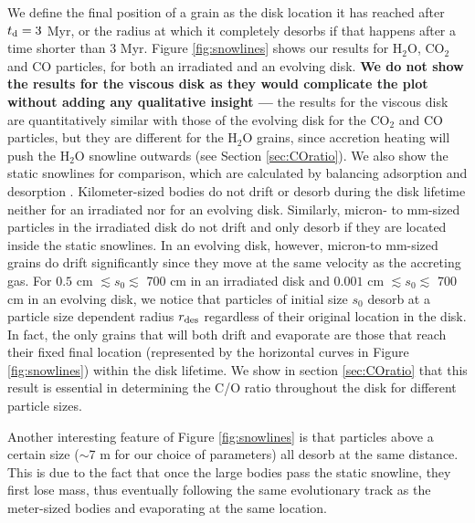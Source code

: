 \documentclass[apj]{emulateapj}
\begin{document}
We define the final position of a grain as the disk location it has reached after $t_{\rm d}=3$ Myr, or the radius at which it completely desorbs if that happens after a time shorter than 3 Myr.  Figure \ref{fig:snowlines} shows our results for H$_2$O, CO$_2$ and CO particles, for both an irradiated and an evolving disk. \textbf{We do not show the results for the viscous disk as they would complicate the plot without adding any qualitative insight --- } the results for the viscous disk are quantitatively similar with those of the evolving disk for the CO$_2$ and CO particles, but they are different for the H$_2$O grains, since accretion heating will push the H$_2$O snowline outwards (see Section \ref{sec:COratio}). We also show the static snowlines for comparison, which are calculated by balancing adsorption and desorption \citep{hollenbach09}. %
Kilometer-sized bodies do not drift or desorb during the disk lifetime neither for an irradiated nor for an evolving disk. Similarly, micron- to mm-sized particles in the irradiated disk do not drift and only %
desorb if %
they are located inside the static snowlines. %
In an evolving disk, however, micron-to mm-sized grains do drift significantly since they move at the same velocity as the accreting gas. For $0.5$ cm $\lesssim s_0 \lesssim$ 700 cm in an irradiated disk and $0.001$ cm $\lesssim s_0 \lesssim$ 700 cm in an evolving disk, we notice that particles of initial size $s_0$ desorb at a %
particle size dependent radius $r_{\rm des}$ regardless of their original location in the disk. In fact, the only grains that will both drift and evaporate are those that reach their fixed final location (represented by the horizontal curves in Figure \ref{fig:snowlines}) within the disk lifetime. We show in section \ref{sec:COratio} that this result is essential in determining the C/O ratio throughout the disk for different particle sizes. 

Another interesting feature of Figure \ref{fig:snowlines} is that particles above a certain size ($\sim$7 m for our choice of parameters) all desorb at the same distance. This is due to the fact that once the large bodies pass the static snowline, they first lose mass, thus eventually following the same evolutionary track as the meter-sized bodies and evaporating at the same location.
\end{document}
